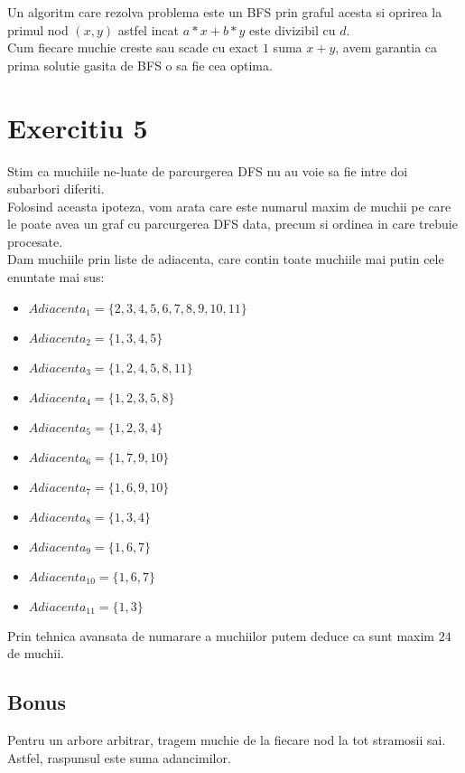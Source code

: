 \documentclass{article}
\begin{document}
Un algoritm care rezolva problema este un BFS prin graful acesta si oprirea la primul nod $(x, y)$ astfel incat $a*x+b*y$ este divizibil cu $d$.\\
Cum fiecare muchie creste sau scade cu exact $1$ suma $x + y$, avem garantia ca prima solutie gasita de BFS o sa fie cea optima.

\section*{Exercitiu 5}

Stim ca muchiile ne-luate de parcurgerea DFS nu au voie sa fie intre doi subarbori diferiti.\\
Folosind aceasta ipoteza, vom arata care este numarul maxim de muchii pe care le poate avea un graf cu parcurgerea DFS data, precum si ordinea in care trebuie procesate.\\Dam muchiile prin liste de adiacenta, care contin toate muchiile mai putin cele enuntate mai sus:
\begin{itemize}
    \item $Adiacenta_1 = \{2, 3, 4, 5, 6, 7, 8, 9, 10, 11\}$
    \item $Adiacenta_2 = \{1, 3, 4, 5\}$
    \item $Adiacenta_3 = \{1, 2, 4, 5, 8, 11\}$
    \item $Adiacenta_4 = \{1, 2, 3, 5, 8\}$
    \item $Adiacenta_5 = \{1, 2, 3, 4\}$
    \item $Adiacenta_6 = \{1, 7, 9, 10\}$
    \item $Adiacenta_7 = \{1, 6, 9, 10\}$
    \item $Adiacenta_8 = \{1, 3, 4\}$
    \item $Adiacenta_9 = \{1, 6, 7\}$
    \item $Adiacenta_10 = \{1, 6, 7\}$
    \item $Adiacenta_11 = \{1, 3\}$
\end{itemize}

Prin tehnica avansata de numarare a muchiilor putem deduce ca sunt maxim $24$ de muchii.

\subsection*{Bonus}
Pentru un arbore arbitrar, tragem muchie de la fiecare nod la tot stramosii sai.\\
Astfel, raspunsul este suma adancimilor.
\end{document}
